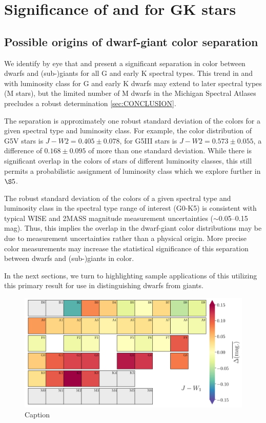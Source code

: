 \chapter{Significance of \jwone and \jwtwo for GK stars}\label{chap:RESULTS}
\section{Possible origins of dwarf-giant color separation}


We identify by eye that \jwone and \jwtwo present a significant separation in color between dwarfs and (sub-)giants for all G and early K spectral types. This trend in \jwone and \jwtwo with luminosity class for G and early K dwarfs may extend to later spectral types (M stars), but the limited number of M dwarfs in the Michigan Spectral Atlases precludes a robust determination \ref{sec:CONCLUSION}.

The separation is approximately one robust standard deviation of the colors for a given spectral type and luminosity class. For example, the color distribution of G5V stars is $J-W2=0.405\pm0.078$, for G5III stars is $J-W2=0.573\pm0.055$, a difference of $0.168\pm0.095$ of more than one standard deviation. While there is significant overlap in the colors of stars of different luminosity classes, this still permits a probabilistic assignment of luminosity class which we explore further in ${\S}5$.

The robust standard deviation of the colors of a given spectral type and luminosity class in the spectral type range of interest (G0-K5) is consistent with typical WISE and 2MASS magnitude measurement uncertainties ($\sim$0.05--0.15 mag). Thus, this implies the overlap in the dwarf-giant color distributions may be due to measurement uncertainties rather than a physical origin.  More precise color measurements may increase the statistical significance of this separation between dwarfs and (sub-)giants in color.

In the next sections, we turn to highlighting sample applications of this utilizing this primary result for use in distinguishing dwarfs from giants.
\begin{figure}
    \centering
    \includegraphics[width=1.0\textwidth,clip=true]{Figures/periodic/periodic-delta_J_W1.png}
    \caption{Caption}
    \label{fig:periodic-delta-jw1}
\end{figure}


